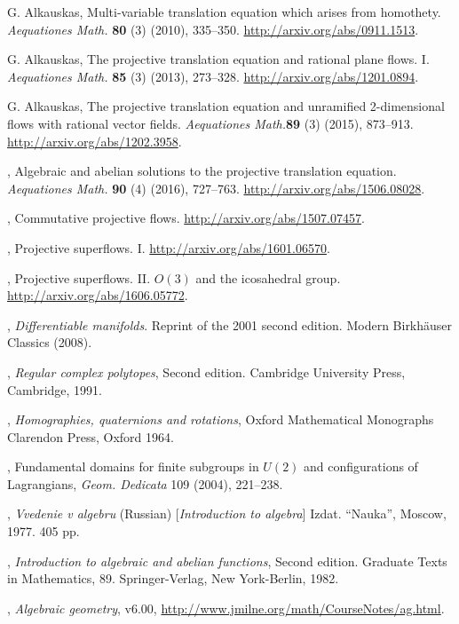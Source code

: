 \documentclass[reqno,12pt]{amsart}
\begin{document}
\begin{thebibliography}{9}

 {\sc G. Alkauskas}, Multi-variable translation equation which arises from homothety. {\it Aequationes Math.} {\bf 80} (3) (2010), 335--350. \url{http://arxiv.org/abs/0911.1513}.

 {\sc G. Alkauskas}, The projective translation equation and rational plane flows. I. {\it Aequationes Math.} {\bf 85} (3) (2013), 273--328. \url{http://arxiv.org/abs/1201.0894}.

 {\sc G. Alkauskas}, The projective translation equation and unramified 2-dimensional flows with rational vector fields.  {\it Aequationes Math.}{\bf 89} (3) (2015), 873--913.  \url{http://arxiv.org/abs/1202.3958}.

, Algebraic and abelian solutions to the projective translation equation. {\it Aequationes Math.}  {\bf 90} (4) (2016), 727--763. \url{http://arxiv.org/abs/1506.08028}.

, Commutative projective flows. \url{http://arxiv.org/abs/1507.07457}.

, Projective superflows. I. \url{http://arxiv.org/abs/1601.06570}.

, Projective superflows. II. $O(3)$ and the icosahedral group. \url{http://arxiv.org/abs/1606.05772}.
  
, {\it Differentiable manifolds}. Reprint of the 2001 second edition. Modern Birkh\"{a}user Classics (2008).  
  
, {\it Regular complex polytopes}, Second edition. Cambridge University Press, Cambridge, 1991.

, {\it Homographies, quaternions and rotations}, Oxford Mathematical Monographs Clarendon Press, Oxford 1964.

, Fundamental domains for finite subgroups in $U(2)$ and configurations of Lagrangians, {\it Geom. Dedicata} 109 (2004), 221--238.

, {\it Vvedenie v algebru} (Russian) [{\it Introduction to algebra}] Izdat. ``Nauka'', Moscow, 1977. 405 pp.   
  
, {\it Introduction to algebraic and abelian functions}, Second edition. Graduate Texts in Mathematics, 89. Springer-Verlag, New York-Berlin, 1982.

, {\it Algebraic geometry}, v6.00, \url{http://www.jmilne.org/math/CourseNotes/ag.html}.

\end{thebibliography}
\end{document}
